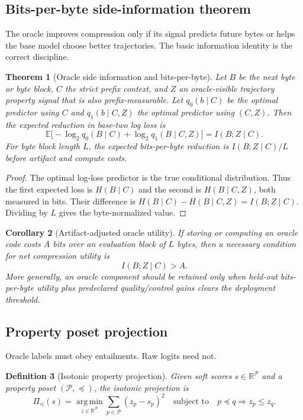 \documentclass[11pt]{article}
\newtheorem{theorem}{Theorem}[section]
\newtheorem{corollary}[theorem]{Corollary}
\newtheorem{definition}[theorem]{Definition}
\newcommand{\RR}{\mathbb{R}}
\newcommand{\calP}{\mathcal{P}}
\newcommand{\argmin}{\operatorname*{arg\,min}}
\numberwithin{equation}{section}
\begin{document}
\subsection{Bits-per-byte side-information theorem}
The oracle improves compression only if its signal predicts future bytes or helps the base model choose better trajectories. The basic information identity is the correct discipline.

\begin{theorem}[Oracle side information and bits-per-byte]
Let $B$ be the next byte or byte block, $C$ the strict prefix context, and $Z$ an oracle-visible trajectory property signal that is also prefix-measurable. Let $q_0(b\mid C)$ be the optimal predictor using $C$ and $q_1(b\mid C,Z)$ the optimal predictor using $(C,Z)$. Then the expected reduction in base-two log loss is
\begin{equation}
\mathbb{E}\big[-\log_2 q_0(B\mid C)+\log_2 q_1(B\mid C,Z)\big]=I(B;Z\mid C).
\end{equation}
For byte block length $L$, the expected bits-per-byte reduction is $I(B;Z\mid C)/L$ before artifact and compute costs.
\end{theorem}
\begin{proof}
The optimal log-loss predictor is the true conditional distribution. Thus the first expected loss is $H(B\mid C)$ and the second is $H(B\mid C,Z)$, both measured in bits. Their difference is $H(B\mid C)-H(B\mid C,Z)=I(B;Z\mid C)$. Dividing by $L$ gives the byte-normalized value.
\end{proof}

\begin{corollary}[Artifact-adjusted oracle utility]
If storing or computing an oracle code costs $A$ bits over an evaluation block of $L$ bytes, then a necessary condition for net compression utility is
\begin{equation}
I(B;Z\mid C) > A.
\end{equation}
More generally, an oracle component should be retained only when held-out bits-per-byte utility plus predeclared quality/control gains clears the deployment threshold.
\end{corollary}

\subsection{Property poset projection}
Oracle labels must obey entailments. Raw logits need not.

\begin{definition}[Isotonic property projection]
Given soft scores $s\in\RR^{\calP}$ and a property poset $(\calP,\preceq)$, the isotonic projection is
\begin{equation}
\Pi_{\preceq}(s)=\argmin_{z\in\RR^{\calP}}\sum_{p\in\calP}(z_p-s_p)^2
\quad\text{subject to}\quad p\preceq q\Rightarrow z_p\le z_q.
\end{equation}
\end{definition}
\end{document}
